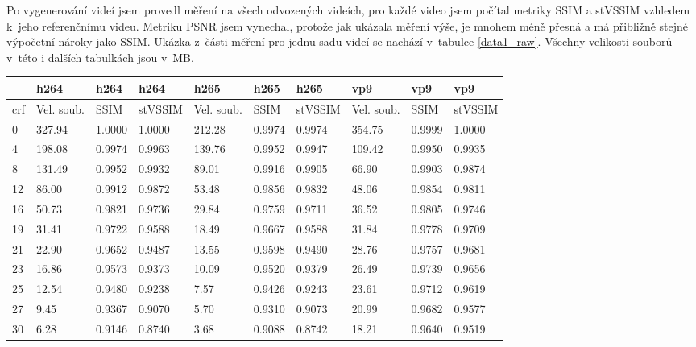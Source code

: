 \documentclass[thesis=M,czech]{FITthesis}[2016/06/26]
\begin{document}
Po vygenerování videí jsem provedl měření na všech odvozených videích, pro každé video jsem počítal metriky SSIM a stVSSIM vzhledem k~jeho referenčnímu videu. Metriku PSNR jsem vynechal, protože jak ukázala měření výše, je mnohem méně přesná a má přibližně stejné výpočetní nároky jako SSIM. Ukázka z~části měření pro jednu sadu videí se nachází v~tabulce \ref{data1_raw}. Všechny velikosti souborů v~této i dalších tabulkách jsou v~MB.
\begin{table}[]
\centering
\begin{tabular}{|p{.3cm}|p{0.95cm}|p{0.95cm}|p{1.3cm}|p{0.95cm}|p{0.95cm}|p{1.3cm}|p{0.95cm}|p{0.95cm}|p{1.3cm}|}
\hline
    & h264       & h264   & h264    & h265       & h265   & h265    & vp9        & vp9    & vp9     \\ \hline
crf & Vel. soub. & SSIM   & stVSSIM & Vel. soub. & SSIM   & stVSSIM & Vel. soub. & SSIM   & stVSSIM \\ \hline  \hline
0   & 327.94     & 1.0000 & 1.0000  & 212.28     & 0.9974 & 0.9974  & 354.75     & 0.9999 & 1.0000  \\ \hline
4   & 198.08     & 0.9974 & 0.9963  & 139.76     & 0.9952 & 0.9947  & 109.42     & 0.9950 & 0.9935  \\ \hline
8   & 131.49     & 0.9952 & 0.9932  & 89.01      & 0.9916 & 0.9905  & 66.90      & 0.9903 & 0.9874  \\ \hline
12  & 86.00      & 0.9912 & 0.9872  & 53.48      & 0.9856 & 0.9832  & 48.06      & 0.9854 & 0.9811  \\ \hline
16  & 50.73      & 0.9821 & 0.9736  & 29.84      & 0.9759 & 0.9711  & 36.52      & 0.9805 & 0.9746  \\ \hline
19  & 31.41      & 0.9722 & 0.9588  & 18.49      & 0.9667 & 0.9588  & 31.84      & 0.9778 & 0.9709  \\ \hline
21  & 22.90      & 0.9652 & 0.9487  & 13.55      & 0.9598 & 0.9490  & 28.76      & 0.9757 & 0.9681  \\ \hline
23  & 16.86      & 0.9573 & 0.9373  & 10.09      & 0.9520 & 0.9379  & 26.49      & 0.9739 & 0.9656  \\ \hline
25  & 12.54      & 0.9480 & 0.9238  & 7.57       & 0.9426 & 0.9243  & 23.61      & 0.9712 & 0.9619  \\ \hline
27  & 9.45       & 0.9367 & 0.9070  & 5.70       & 0.9310 & 0.9073  & 20.99      & 0.9682 & 0.9577  \\ \hline
30  & 6.28       & 0.9146 & 0.8740  & 3.68       & 0.9088 & 0.8742  & 18.21      & 0.9640 & 0.9519  \\ \hline

\end{tabular}
\end{table}
\end{document}
